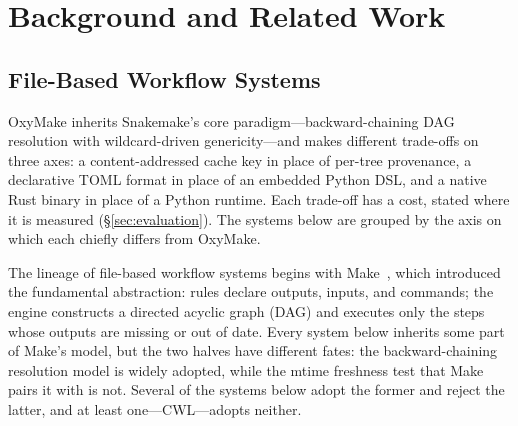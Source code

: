 \documentclass[12pt,a4paper]{article}
\begin{document}
\section{Background and Related Work}
\label{sec:related}

\subsection{File-Based Workflow Systems}
\label{sec:file-based}

OxyMake inherits Snakemake's core paradigm---backward-chaining DAG
resolution with wildcard-driven genericity---and makes different
trade-offs on three axes: a content-addressed cache key in place of
per-tree provenance, a declarative TOML format in place of an embedded
Python DSL, and a native Rust binary in place of a Python runtime. Each
trade-off has a cost, stated where it is measured (\S\ref{sec:evaluation}).
The systems below are grouped by the axis on which each chiefly
differs from OxyMake.

The lineage of file-based workflow systems begins with
Make~\cite{feldmanMakeProgram1979}, which introduced the fundamental
abstraction: rules declare outputs, inputs, and commands; the engine
constructs a directed acyclic graph (DAG) and executes only the steps whose
outputs are missing or out of date. Every system below inherits some
part of Make's model, but the two halves have different fates: the
backward-chaining resolution model is widely adopted, while the mtime
freshness test that Make pairs it with is not. Several of the systems
below adopt the former and reject the latter, and at least
one---CWL---adopts neither.
\end{document}
